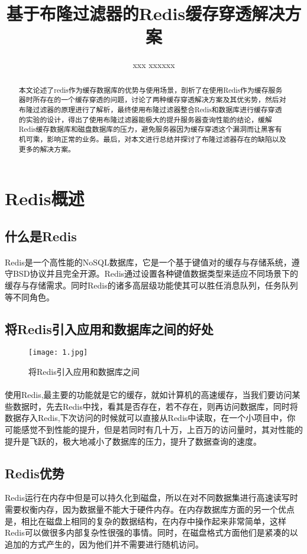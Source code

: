 \documentclass[lang=cn,11pt,a4paper,cite=numbers]{elegantpaper}
\title{基于布隆过滤器的Redis缓存穿透解决方案}
\author{xxx  xxxxxx}
\date{}
\begin{document}
\maketitle

\begin{abstract}本文论述了redis作为缓存数据库的优势与使用场景，剖析了在使用Redis作为缓存服务器时所存在的一个缓存穿透的问题，讨论了两种缓存穿透解决方案及其优劣势，然后对布隆过滤器的原理进行了解析，最终使用布隆过滤器整合Redis和数据库进行缓存穿透的实验的设计，得出了使用布隆过滤器能极大的提升服务器查询性能的结论，缓解Redis缓存数据库和磁盘数据库的压力，避免服务器因为缓存穿透这个漏洞而让黑客有机可乘，影响正常的业务。最后，对本文进行总结并探讨了布隆过滤器存在的缺陷以及更多的解决方案。
\end{abstract}

\section{Redis概述}
\subsection{什么是Redis}
\paragraph{}Redis是一个高性能的NoSQL数据库，它是一个基于键值对的缓存与存储系统，遵守BSD协议并且完全开源。Redis通过设置各种键值数据类型来适应不同场景下的缓存与存储需求。同时Redis的诸多高层级功能使其可以胜任消息队列，任务队列等不同角色。
\subsection{将Redis引入应用和数据库之间的好处}
\begin{figure}[!htb]
    \centering
    \texttt{[image: 1.jpg]}
    \caption{将Redis引入应用和数据库之间}
\end{figure}
\paragraph{}使用Redis,最主要的功能就是它的缓存，就如计算机的高速缓存，当我们要访问某些数据时，先去Redis中找，看其是否存在，若不存在，则再访问数据库，同时将数据存入Redis,下次访问的时候就可以直接从Redis中读取，在一个小项目中，你可能感觉不到性能的提升，但是若同时有几十万，上百万的访问量时，其对性能的提升是飞跃的，极大地减小了数据库的压力，提升了数据查询的速度。
\subsection{Redis优势}
Redis运行在内存中但是可以持久化到磁盘，所以在对不同数据集进行高速读写时需要权衡内存，因为数据量不能大于硬件内存。在内存数据库方面的另一个优点是，相比在磁盘上相同的复杂的数据结构，在内存中操作起来非常简单，这样Redis可以做很多内部复杂性很强的事情。同时，在磁盘格式方面他们是紧凑的以追加的方式产生的，因为他们并不需要进行随机访问。
\end{document}
